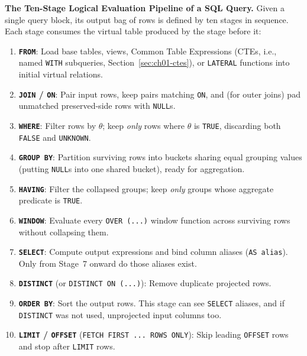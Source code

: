 \begin{formalbox}
\textbf{The Ten-Stage Logical Evaluation Pipeline of a SQL Query.} Given a single query block, its output bag of rows is defined by ten stages in sequence. Each stage consumes the virtual table produced by the stage before it:
\begin{enumerate}
  \item \textbf{\texttt{FROM}}: Load base tables, views, Common Table Expressions (CTEs, i.e., named \texttt{WITH} subqueries, Section~\ref{sec:ch01-ctes}), or \texttt{LATERAL} functions into initial virtual relations.
  \item \textbf{\texttt{JOIN} / \texttt{ON}}: Pair input rows, keep pairs matching \texttt{ON}, and (for outer joins) pad unmatched preserved-side rows with \texttt{NULL}s.
  \item \textbf{\texttt{WHERE}}: Filter rows by $\theta$; keep \emph{only} rows where $\theta$ is \texttt{TRUE}, discarding both \texttt{FALSE} and \texttt{UNKNOWN}.
  \item \textbf{\texttt{GROUP BY}}: Partition surviving rows into buckets sharing equal grouping values (putting \texttt{NULL}s into one shared bucket), ready for aggregation.
  \item \textbf{\texttt{HAVING}}: Filter the collapsed groups; keep \emph{only} groups whose aggregate predicate is \texttt{TRUE}.
  \item \textbf{\texttt{WINDOW}}: Evaluate every \texttt{OVER (...)} window function across surviving rows without collapsing them.
  \item \textbf{\texttt{SELECT}}: Compute output expressions and bind column aliases (\texttt{AS alias}). Only from Stage~7 onward do those aliases exist.
  \item \textbf{\texttt{DISTINCT}} (or \texttt{DISTINCT ON (...)}): Remove duplicate projected rows.
  \item \textbf{\texttt{ORDER BY}}: Sort the output rows. This stage can see \texttt{SELECT} aliases, and if \texttt{DISTINCT} was not used, unprojected input columns too.
  \item \textbf{\texttt{LIMIT} / \texttt{OFFSET}} (\texttt{FETCH FIRST ... ROWS ONLY}): Skip leading \texttt{OFFSET} rows and stop after \texttt{LIMIT} rows.
\end{enumerate}
\end{formalbox}

